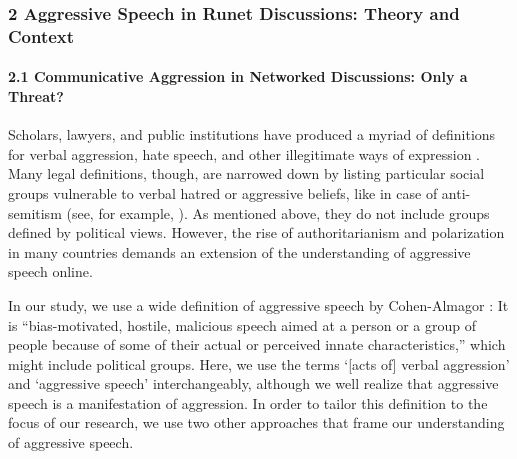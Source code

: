 \subsubsection{2 Aggressive Speech in Runet Discussions: Theory and Context}

\paragraph{2.1 Communicative Aggression in Networked Discussions: Only a Threat?} 
Scholars, lawyers, and public institutions have produced a myriad of definitions for verbal aggression, hate speech, and other illegitimate ways of expression \cite{Brown2017a,Brown2017b}. Many legal definitions, though, are narrowed down by listing particular social groups vulnerable to verbal hatred or aggressive beliefs, like in case of anti-semitism (see, for example, \cite[p. 107]{CouncilOfEurope}). As mentioned above, they do not include groups defined by political views. However, the rise of authoritarianism and polarization in many countries demands an extension of the understanding of aggressive speech online.

In our study, we use a wide definition of aggressive speech by Cohen-Almagor \cite[p.~1]{CohenAlmagor}: It is “bias-motivated, hostile, malicious speech aimed at a person or a group of people because of some of their actual or perceived innate characteristics,” which might include political groups. Here, we use the terms ‘[acts of] verbal aggression’ and ‘aggressive speech’ interchangeably, although we well realize that aggressive speech is a manifestation of aggression. In order to tailor this definition to the focus of our research, we use two other approaches that frame our understanding of aggressive speech.

